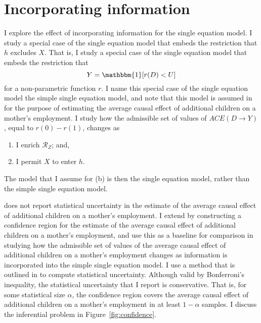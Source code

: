 \documentclass[12pt,a4paper,twoside]{article}
\numberwithin{equation}{section}
\begin{document}
\section{Incorporating information}
I explore the effect of incorporating information for the single equation model. I study a special case of the single equation model that embeds the restriction that $h$ excludes $X$. That is, I study a special case of the single equation model that embeds the restriction that 
\[Y=\mathbbm{1}[r(D)<U]\]
for a non-parametric function $r$. I name this special case of the single equation model the simple single equation model, and note that this model is assumed in \cite{cr13} for the purpose of estimating the average causal effect of additional children on a mother's employment. I study how the admissible set of values of $ACE(D\rightarrow Y)$, equal to $r(0)-r(1)$, changes as 
\begin{enumerate}[(a.)]
\item I enrich $\mathcal{R}_Z$; and,
\item I permit $X$ to enter $h$.
\end{enumerate}
The model that I assume for (b) is then the single equation model, rather than the simple single equation model. 

\cite{cr13} does not report statistical uncertainty in the estimate of the average causal effect of additional children on a mother's employment. I extend \cite{cr13} by constructing a confidence region for the estimate of the average causal effect of additional children on a mother's employment, and use this as a baseline for comparison in studying how the admissible set of values of the average causal effect of additional children on a mother's employment changes as information is incorporated into the simple single equation model. I use a method that is outlined in \cite{cHlr13} to compute statistical uncertainty. Although valid by Bonferroni's inequality, the statistical uncertainty that I report is conservative. That is, for some statistical size $\alpha$, the confidence region covers the average causal effect of additional children on a mother's employment in at least $1-\alpha$ samples. I discuss the inferential problem in Figure~\ref{fig:confidence}.
\end{document}
